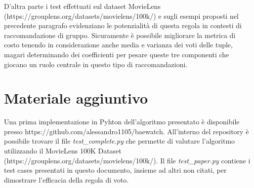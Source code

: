 \documentclass[letterpaper]{article}
\begin{document}
D'altra parte i test effettuati sul dataset MovieLens (https://grouplens.org/datasets/movielens/100k/) e sugli esempi proposti nel precedente paragrafo evidenziano le potenzialità di questa regola in contesti di raccomandazione di gruppo. Sicuramente è possibile migliorare la metrica di costo tenendo in considerazione anche media e varianza dei voti delle tuple, magari determinando dei coefficienti per pesare queste tre componenti che giocano un ruolo centrale in questo tipo di raccomandazioni.

\section{Materiale aggiuntivo}
Una prima implementazione in Pyhton dell'algoritmo presentato è disponibile presso https://github.com/alessandro1105/baewatch. All'interno del repository è possibile trovare il file \emph{test\_complete.py} che permette di valutare l'algoritmo utilizzando il MovieLens 100K Dataset (https://grouplens.org/datasets/movielens/100k/). Il file \emph{test\_paper.py} contiene i test cases presentati in questo documento, insieme ad altri non citati, per dimostrare l'efficacia della regola di voto.

\bigskip

 

\end{document}
